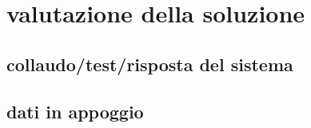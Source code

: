 \section{valutazione della soluzione}

\subsection{collaudo/test/risposta del sistema}

\subsection{dati in appoggio}
